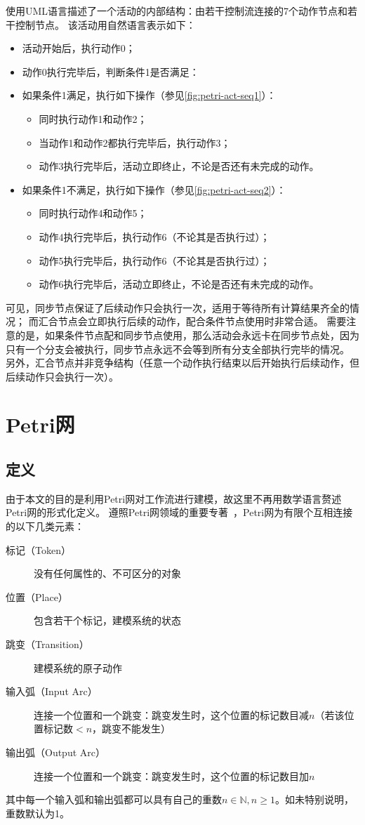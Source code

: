 \documentclass[index]{subfiles}
\begin{document}
使用UML语言描述了一个活动的内部结构：由若干控制流连接的7个动作节点和若干控制节点。
该活动用自然语言表示如下：
\begin{itemize}
  \item 活动开始后，执行动作0；
  \item 动作0执行完毕后，判断条件1是否满足：
  \item 如果条件1满足，执行如下操作（参见\cref{fig:petri-act-seq1}）：
  \begin{itemize}
    \item 同时执行动作1和动作2；
    \item 当动作1和动作2都执行完毕后，执行动作3；
    \item 动作3执行完毕后，活动立即终止，不论是否还有未完成的动作。
  \end{itemize}
  \item 如果条件1不满足，执行如下操作（参见\cref{fig:petri-act-seq2}）：
  \begin{itemize}
    \item 同时执行动作4和动作5；
    \item 动作4执行完毕后，执行动作6（不论其是否执行过）；
    \item 动作5执行完毕后，执行动作6（不论其是否执行过）；
    \item 动作6执行完毕后，活动立即终止，不论是否还有未完成的动作。
  \end{itemize}
\end{itemize}

可见，同步节点保证了后续动作只会执行一次，适用于等待所有计算结果齐全的情况；
而汇合节点会立即执行后续的动作，配合条件节点使用时非常合适。
需要注意的是，如果条件节点配和同步节点使用，那么活动会永远卡在同步节点处，因为只有一个分支会被执行，同步节点永远不会等到所有分支全部执行完毕的情况。
另外，汇合节点并非竞争结构（任意一个动作执行结束以后开始执行后续动作，但后续动作只会执行一次）。

\section{Petri网}
\subsection{定义}
由于本文的目的是利用Petri网对工作流进行建模，故这里不再用数学语言赘述Petri网的形式化定义。
遵照Petri网领域的重要专著~，Petri网为有限个互相连接的以下几类元素：
\begin{description}
  \item[标记（Token）] 没有任何属性的、不可区分的对象
  \item[位置（Place）] 包含若干个标记，建模系统的状态
  \item[跳变（Transition）] 建模系统的原子动作
  \item[输入弧（Input Arc）] 连接一个位置和一个跳变：跳变发生时，这个位置的标记数目减$n$（若该位置标记数$<n$，跳变不能发生）
  \item[输出弧（Output Arc）] 连接一个位置和一个跳变：跳变发生时，这个位置的标记数目加$n$
\end{description}
其中每一个输入弧和输出弧都可以具有自己的重数$n\in\mathbb{N}, n\geq1$。如未特别说明，重数默认为1。
\end{document}
